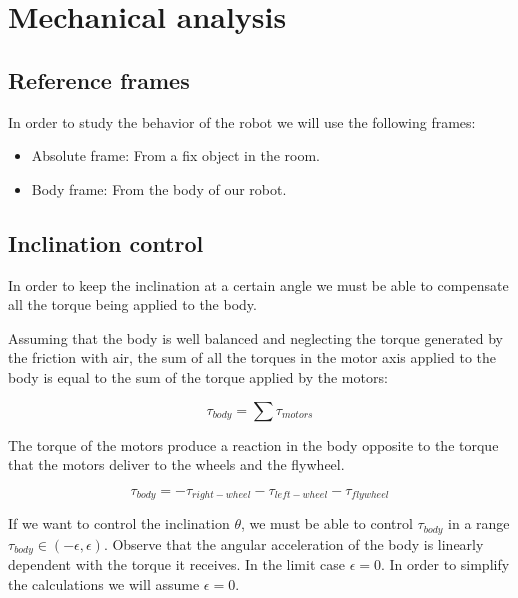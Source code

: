 \section{Mechanical analysis}
\subsection{Reference frames}
In order to study the behavior of the robot we will use the following frames:
\begin{itemize}
    \item Absolute frame: From a fix object in the room. 
    \item Body frame: From the body of our robot.
\end{itemize}



\subsection{Inclination control}
In order to keep the inclination at a certain angle we must be able to compensate all the torque being applied to the body.

Assuming that the body is well balanced and neglecting the torque generated by the friction with air, the sum of all the torques in the motor axis applied to the body is equal to the sum of the torque applied by the motors:

\[\tau_{body} = \sum \tau_{motors}\]

The torque of the motors produce a reaction in the body opposite to the torque that the motors deliver to the wheels and the flywheel.

\[\tau_{body} = -\tau_{right-wheel} -\tau_{left-wheel} -\tau_{flywheel} \]

If we want to control the inclination $\theta$, we must be able to control $\tau_{body}$ in a range $\tau_{body} \in (-\epsilon, \epsilon)$. Observe that the angular acceleration of the body is linearly dependent with the torque it receives. In the limit case $\epsilon = 0$. In order to simplify the calculations we will assume $\epsilon = 0$.

